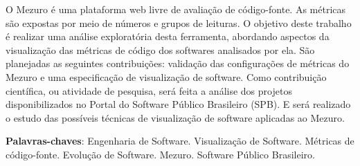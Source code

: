 \begin{resumo}
 O Mezuro é uma plataforma web livre de avaliação de código-fonte.
 As métricas são expostas por meio de números e grupos de leituras.
 O objetivo deste trabalho é realizar uma análise exploratória desta ferramenta,
 abordando aspectos da visualização das métricas de código dos softwares
 analisados por ela.
 São planejadas as seguintes contribuições: validação das configurações de
 métricas do Mezuro e uma especificação de visualização de software.
 Como contribuição científica, ou atividade de pesquisa, será feita a análise
 dos projetos disponibilizados no Portal do Software Público Brasileiro (SPB).
 E será realizado o estudo das possíveis técnicas de visualização de software
 aplicadas ao Mezuro.

 \vspace{\onelineskip}

 \noindent
 \textbf{Palavras-chaves}: Engenharia de Software. Visualização de Software.
 Métricas de código-fonte. Evolução de Software. Mezuro. Software Público
 Brasileiro.
\end{resumo}
